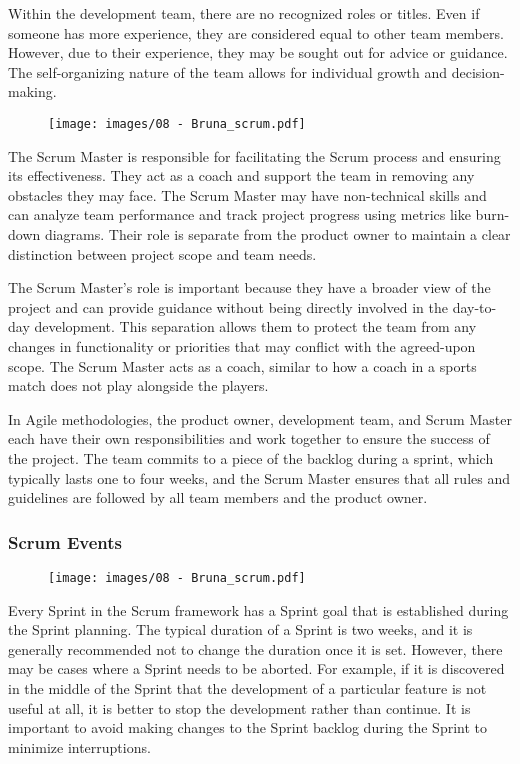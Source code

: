 Within the development team, there are no recognized roles or titles.
Even if someone has more experience, they are considered equal to other
team members. However, due to their experience, they may be sought out
for advice or guidance. The self-organizing nature of the team allows
for individual growth and decision-making.

\begin{figure}[!h]
  \centering
  \texttt{[image: images/08 - Bruna\_scrum.pdf]}
\end{figure}

The Scrum Master is responsible for facilitating the Scrum process and
ensuring its effectiveness. They act as a coach and support the team in
removing any obstacles they may face. The Scrum Master may have
non-technical skills and can analyze team performance and track project
progress using metrics like burn-down diagrams. Their role is separate
from the product owner to maintain a clear distinction between project
scope and team needs.

The Scrum Master's role is important because they have a broader view of
the project and can provide guidance without being directly involved in
the day-to-day development. This separation allows them to protect the
team from any changes in functionality or priorities that may conflict
with the agreed-upon scope. The Scrum Master acts as a coach, similar to
how a coach in a sports match does not play alongside the players.

In Agile methodologies, the product owner, development team, and Scrum
Master each have their own responsibilities and work together to ensure
the success of the project. The team commits to a piece of the backlog
during a sprint, which typically lasts one to four weeks, and the Scrum
Master ensures that all rules and guidelines are followed by all team
members and the product owner.

\subsubsection{Scrum Events}

\begin{figure}[!h]
  \centering
  \texttt{[image: images/08 - Bruna\_scrum.pdf]}
\end{figure}

Every Sprint in the Scrum framework has a Sprint goal that is
established during the Sprint planning. The typical duration of a Sprint
is two weeks, and it is generally recommended not to change the duration
once it is set. However, there may be cases where a Sprint needs to be
aborted. For example, if it is discovered in the middle of the Sprint
that the development of a particular feature is not useful at all, it is
better to stop the development rather than continue. It is important to
avoid making changes to the Sprint backlog during the Sprint to minimize
interruptions.

